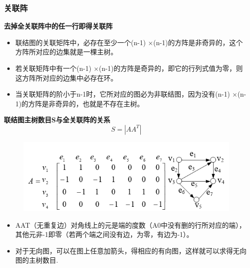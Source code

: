\subsubsection{关联阵}
\textbf{去掉全关联阵中的任一行即得关联阵}
\begin{itemize}
	\item 联结图的关联矩阵中，必存在至少一个(n-1) ×(n-1)的方阵是非奇异的，这个方阵所对应的边集就是一棵主树。
	\item 若关联矩阵中有一个(n-1) ×(n-1)的方阵是奇异的，即它的行列式值为零，则这方阵所对应的边集中必存在环。
	\item 当关联矩阵的阶小于n-1时，它所对应的图必为非联结图，因为没有(n-1) ×(n-1)的方阵是非奇异的，也就是不存在主树。
\end{itemize}
\textbf{联结图主树数目S与全关联阵的关系
}\begin{equation}\label{key}
S = |AA^T|
\end{equation}
\begin{figure}[H]
	\centering
	\includegraphics[width=0.7\linewidth]{figures/screenshot062}
	\caption{}
	\label{fig:screenshot062}
\end{figure}
\begin{itemize}
	\item AAT（无重复边）对角线上的元是端的度数（A0中没有删的行所对应的端），其他元非-1即零（若两个端之间没有边，为零，有边为-1）。
	\item 对于无向图，可以在图上任意加箭头，得相应的有向图，这样就可以求得无向图的主树数目.
\end{itemize}
